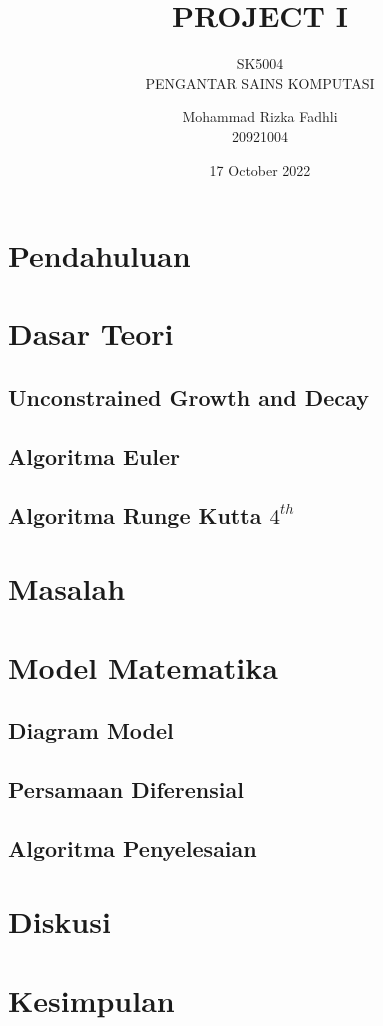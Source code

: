 \documentclass[
  12pt,
]{article}
\title{PROJECT I}
\subtitle{SK5004\\
PENGANTAR SAINS KOMPUTASI}
\author{Mohammad Rizka Fadhli\\
20921004}
\date{17 October 2022}
\begin{document}
\maketitle

\hypertarget{pendahuluan}{%
\section{Pendahuluan}\label{pendahuluan}}

\hypertarget{dasar-teori}{%
\section{Dasar Teori}\label{dasar-teori}}

\hypertarget{unconstrained-growth-and-decay}{%
\subsection{Unconstrained Growth and
Decay}\label{unconstrained-growth-and-decay}}

\hypertarget{algoritma-euler}{%
\subsection{Algoritma Euler}\label{algoritma-euler}}

\hypertarget{algoritma-runge-kutta-4th}{%
\subsection{\texorpdfstring{Algoritma Runge Kutta
\(4^{th}\)}{Algoritma Runge Kutta 4\^{}\{th\}}}\label{algoritma-runge-kutta-4th}}

\hypertarget{masalah}{%
\section{Masalah}\label{masalah}}

\hypertarget{model-matematika}{%
\section{Model Matematika}\label{model-matematika}}

\hypertarget{diagram-model}{%
\subsection{Diagram Model}\label{diagram-model}}

\hypertarget{persamaan-diferensial}{%
\subsection{Persamaan Diferensial}\label{persamaan-diferensial}}

\hypertarget{algoritma-penyelesaian}{%
\subsection{Algoritma Penyelesaian}\label{algoritma-penyelesaian}}

\hypertarget{diskusi}{%
\section{Diskusi}\label{diskusi}}

\hypertarget{kesimpulan}{%
\section{Kesimpulan}\label{kesimpulan}}
\end{document}

